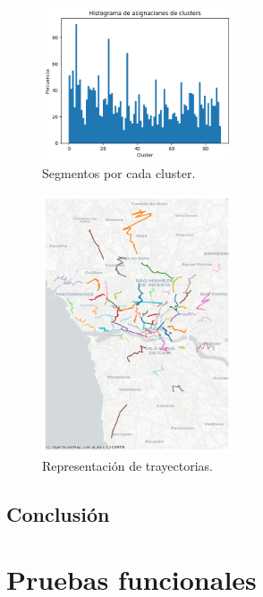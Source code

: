 \begin{enumerate}
\begin{figure}[h!]
    \centering
    \includegraphics[width=0.5\textwidth]{img/histograma_Spect.png}
    \caption{Segmentos por cada cluster.}
    \label{fig:histograma_Spectral}
\end{figure}

\begin{figure}[h!]
    \centering
    \includegraphics[width=0.5\textwidth]{img/r_tray_Spect.png}
    \caption{Representación de trayectorias.}
    \label{fig:trayectorias_Spectral}
\end{figure}

\FloatBarrier

\end{enumerate}

\subsection{Conclusión}



\section{Pruebas funcionales}


